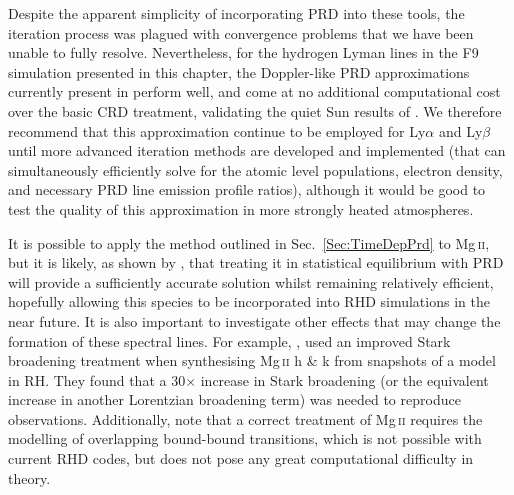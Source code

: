 Despite the apparent simplicity of incorporating PRD into these tools, the iteration process was plagued with convergence problems that we have been unable to fully resolve.
Nevertheless, for the hydrogen Lyman lines in the F9 simulation presented in this chapter, the Doppler-like PRD approximations currently present in \Radyn{} perform well, and come at no additional computational cost over the basic CRD treatment, validating the quiet Sun results of \citet{Leenaarts2012a}.
We therefore recommend that this approximation continue to be employed for Ly$\alpha$ and Ly$\beta$ until more advanced iteration methods are developed and implemented (that can simultaneously efficiently solve for the atomic level populations, electron density, and necessary PRD line emission profile ratios), although it would be good to test the quality of this approximation in more strongly heated atmospheres.

It is possible to apply the method outlined in Sec.~\ref{Sec:TimeDepPrd} to Mg\,\textsc{ii}, but it is likely, as shown by \citet{Kerr2019}, that treating it in statistical equilibrium with PRD will provide a sufficiently accurate solution whilst remaining relatively efficient, hopefully allowing this species to be incorporated into RHD simulations in the near future.
It is also important to investigate other effects that may change the formation of these spectral lines.
For example, \citet{Zhu2019}, used an improved Stark broadening treatment when synthesising Mg\,\textsc{ii} h \& k from snapshots of a \Radyn{} model in RH.
They found that a 30$\times$ increase in Stark broadening (or the equivalent increase in another Lorentzian broadening term) was needed to reproduce observations.
Additionally, \citet{Kowalski2017a} note that a correct treatment of Mg\,\textsc{ii} requires the modelling of overlapping bound-bound transitions, which is not possible with current RHD codes, but does not pose any great computational difficulty in theory.

